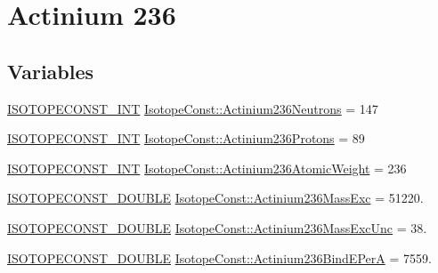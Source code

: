 \hypertarget{group___isotope_const-_actinium-_ac236}{}\section{Actinium 236}
\label{group___isotope_const-_actinium-_ac236}
\subsection*{Variables}
\begin{DoxyCompactItemize}
\item 
\mbox{\hyperlink{group___isotope_const-_macros_ga5f18360b3e99483a35c32d789e62621c}{I\+S\+O\+T\+O\+P\+E\+C\+O\+N\+S\+T\+\_\+\+I\+NT}} \mbox{\hyperlink{group___isotope_const-_actinium-_ac236_ga3d8f17f7162352ea13c5bd272d514f7d}{Isotope\+Const\+::\+Actinium236\+Neutrons}} = 147
\item 
\mbox{\hyperlink{group___isotope_const-_macros_ga5f18360b3e99483a35c32d789e62621c}{I\+S\+O\+T\+O\+P\+E\+C\+O\+N\+S\+T\+\_\+\+I\+NT}} \mbox{\hyperlink{group___isotope_const-_actinium-_ac236_ga5854e1638fc736c8614c342316473e2f}{Isotope\+Const\+::\+Actinium236\+Protons}} = 89
\item 
\mbox{\hyperlink{group___isotope_const-_macros_ga5f18360b3e99483a35c32d789e62621c}{I\+S\+O\+T\+O\+P\+E\+C\+O\+N\+S\+T\+\_\+\+I\+NT}} \mbox{\hyperlink{group___isotope_const-_actinium-_ac236_ga9cceea54f0b8ca0b9a45cb95d846a780}{Isotope\+Const\+::\+Actinium236\+Atomic\+Weight}} = 236
\item 
\mbox{\hyperlink{group___isotope_const-_macros_ga8f45a7272ce02c0b4c65c44636ed719a}{I\+S\+O\+T\+O\+P\+E\+C\+O\+N\+S\+T\+\_\+\+D\+O\+U\+B\+LE}} \mbox{\hyperlink{group___isotope_const-_actinium-_ac236_ga69a867d2fb519a4231636b6622cab331}{Isotope\+Const\+::\+Actinium236\+Mass\+Exc}} = 51220.
\item 
\mbox{\hyperlink{group___isotope_const-_macros_ga8f45a7272ce02c0b4c65c44636ed719a}{I\+S\+O\+T\+O\+P\+E\+C\+O\+N\+S\+T\+\_\+\+D\+O\+U\+B\+LE}} \mbox{\hyperlink{group___isotope_const-_actinium-_ac236_ga45d2adfad5923c0048daf3325dff0701}{Isotope\+Const\+::\+Actinium236\+Mass\+Exc\+Unc}} = 38.
\item 
\mbox{\hyperlink{group___isotope_const-_macros_ga8f45a7272ce02c0b4c65c44636ed719a}{I\+S\+O\+T\+O\+P\+E\+C\+O\+N\+S\+T\+\_\+\+D\+O\+U\+B\+LE}} \mbox{\hyperlink{group___isotope_const-_actinium-_ac236_ga31a4618ff4373359bf0640749311b757}{Isotope\+Const\+::\+Actinium236\+Bind\+E\+PerA}} = 7559.
\item 

\end{DoxyCompactItemize}
